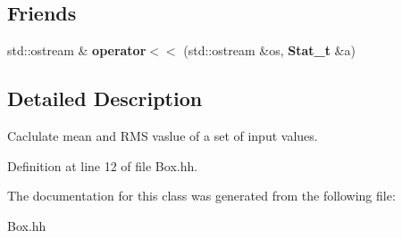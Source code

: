 \subsection*{Friends}
\begin{DoxyCompactItemize}
\item 
std\-::ostream \& {\bfseries operator$<$$<$} (std\-::ostream \&os, {\bf Stat\-\_\-t} \&a)\label{classCALICE_1_1Stat__t_a33122c0e8d33292956fdbf1d86680205}

\end{DoxyCompactItemize}


\subsection{Detailed Description}
Caclulate mean and R\-M\-S vaslue of a set of input values. 

Definition at line 12 of file Box.\-hh.



The documentation for this class was generated from the following file\-:\begin{DoxyCompactItemize}
\item 
Box.\-hh\end{DoxyCompactItemize}
